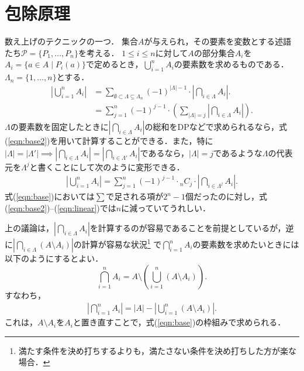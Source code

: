 \documentclass{jsarticle}
\begin{document}
\section{包除原理}

数え上げのテクニックの一つ．
集合$A$が与えられ，その要素を変数とする述語たち$\mathcal{P}=\{P_1, \dots, P_n\}$を考える．
$1\le i\le n$に対して$A$の部分集合$A_i$を$A_i=\{a\in A\mid P_i(a)\}$で定めるとき，$\bigcup_{i=1}^n A_i$の要素数を求めるものである．
$\Lambda_n=\{1, \dots, n\}$とする．
\begin{align}\label{eqn:base}
\left|\bigcup_{i=1}^n A_i\right|
&= \sum_{\emptyset\subset\Lambda\subseteq \Lambda_n} (-1)^{|\Lambda|-1}\cdot \left|\bigcap_{i\in\Lambda} A_i\right|.\\
\label{eqn:base2}
&= \sum_{j=1}^n (-1)^{j-1}\cdot \left(\sum_{|\Lambda|=j} \left|\bigcap_{i\in\Lambda} A_i\right|\right).
\end{align}
$\Lambda$の要素数を固定したときに$\left|\bigcap_{i\in\Lambda} A_i\right|$の総和をDPなどで求められるなら，式(\ref{eqn:base2})を用いて計算することができる．また，特に
$|\Lambda|=|\Lambda'|\implies\left|\bigcap_{i\in\Lambda}A_i\right| = \left|\bigcap_{i\in\Lambda'}A_i\right|$であるなら，$|\Lambda|=j$であるような$\Lambda$の代表元を$\Lambda^j$と書くことにして次のように変形できる．
\begin{align}\label{eqn:linear}
  \left|\bigcup_{i=1}^n A_i\right|
  = \sum_{j=1}^n (-1)^{j-1}\cdot {}_n C_j\cdot\left|\bigcap_{i\in\Lambda^j}A_i\right|.
\end{align}
式(\ref{eqn:base})においては$\sum$で足される項が$2^n-1$個だったのに対し，式(\ref{eqn:base2})--(\ref{eqn:linear})では$n$に減っていてうれしい．

上の議論は，$\left|\bigcap_{i\in\Lambda}A_i\right|$を計算するのが容易であることを前提としているが，逆に$\left|\bigcap_{i\in\Lambda}(A\setminus A_i)\right|$の計算が容易な状況\footnote{満たす条件を決め打ちするよりも，満たさない条件を決め打ちした方が楽な場合．}
で$\bigcap_{i=1}^n A_i$の要素数を求めたいときには以下のようにするとよい．
\[
\bigcap_{i=1}^n A_i = A\setminus\left(\bigcup_{i=1}^n (A\setminus A_i)\right).
\]
すなわち，
\begin{align}\label{eqn:cmpl}
\left|\bigcap_{i=1}^n A_i\right| = |A|-\left|\bigcup_{i=1}^n (A\setminus A_i)\right|.
\end{align}
これは，$A\setminus A_i$を$A_i$と置き直すことで，式(\ref{eqn:base})の枠組みで求められる．
\end{document}
